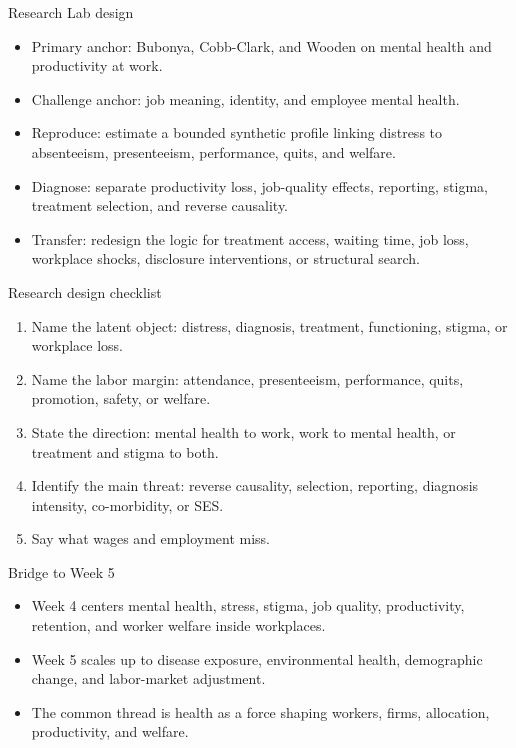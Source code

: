 \documentclass[aspectratio=169,11pt]{beamer}
\begin{document}
\begin{frame}{Research Lab design}
\begin{itemize}
    \item Primary anchor: Bubonya, Cobb-Clark, and Wooden on mental health and productivity at work.
    \item Challenge anchor: job meaning, identity, and employee mental health.
    \item Reproduce: estimate a bounded synthetic profile linking distress to absenteeism, presenteeism, performance, quits, and welfare.
    \item Diagnose: separate productivity loss, job-quality effects, reporting, stigma, treatment selection, and reverse causality.
    \item Transfer: redesign the logic for treatment access, waiting time, job loss, workplace shocks, disclosure interventions, or structural search.
\end{itemize}
\end{frame}

\begin{frame}{Research design checklist}
\begin{enumerate}
    \item Name the latent object: distress, diagnosis, treatment, functioning, stigma, or workplace loss.
    \item Name the labor margin: attendance, presenteeism, performance, quits, promotion, safety, or welfare.
    \item State the direction: mental health to work, work to mental health, or treatment and stigma to both.
    \item Identify the main threat: reverse causality, selection, reporting, diagnosis intensity, co-morbidity, or SES.
    \item Say what wages and employment miss.
\end{enumerate}
\end{frame}

\begin{frame}{Bridge to Week 5}
\begin{itemize}
    \item Week 4 centers mental health, stress, stigma, job quality, productivity, retention, and worker welfare inside workplaces.
    \item Week 5 scales up to disease exposure, environmental health, demographic change, and labor-market adjustment.
    \item The common thread is health as a force shaping workers, firms, allocation, productivity, and welfare.
\end{itemize}
\end{frame}
\end{document}
